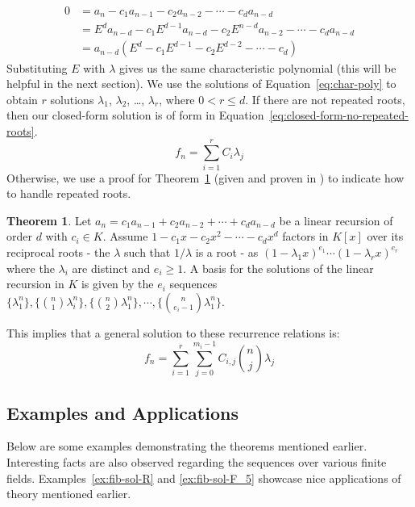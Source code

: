 \documentclass[a4paper]{article}
\theoremstyle{definition}
\newtheorem{theorem}{Theorem}[section]
\begin{document}
\begin{align*}
0
&= a_n-c_1a_{n-1}-c_2a_{n-2}-\cdots-c_{d}a_{n-d} \\
&= E^{d}a_{n-d}-c_1E^{d-1}a_{n-d}-c_2E^{n-d}a_{n-2}-\cdots-c_{d}a_{n-d} \\
&= a_{n-d}(E^d-c_1E^{d-1}-c_2E^{d-2}-\cdots-c_d)
\end{align*}
Substituting $E$ with $\lambda$ gives us the same characteristic polynomial (this will be helpful in the next
section). We use the solutions of Equation~\ref{eq:char-poly} to obtain $r$ solutions $\lambda_1$,
$\lambda_2$, \ldots, $\lambda_r$, where $0<r\le d$. If there are not repeated roots, then our closed-form
solution is of form in Equation~\ref{eq:closed-form-no-repeated-roots}.
\begin{equation}
f_n=\sum_{i=1}^r C_{i}\lambda_j
\label{eq:closed-form-no-repeated-roots}
\end{equation}
Otherwise, we use a proof for Theorem~\ref{thm:repeated-roots} (given and proven in
\cite{bib:solve-lin-rec-field}) to indicate how to handle repeated roots. 
\\
\begin{theorem}
Let $a_n = c_1a_{n-1} + c_2a_{n-2} + \cdots + c_{d}a_{n-d}$ be a linear recursion of order $d$ with
$c_i \in K$. Assume $1 - c_1x - c_2x^2 - \cdots - c_{d}x^d$ factors in $K[x]$ over its reciprocal roots - the
$\lambda$ such that $1/\lambda$ is a root - as $(1-\lambda_{1}x)^{e_1} \cdots (1-\lambda_{r}x)^{e_r}$ where
the $\lambda_i$ are distinct and $e_i \ge 1$. A basis for the solutions of the linear recursion in $K$ is
given by the $e_i$ sequences
$\{\lambda_1^n\}, \{\binom{n}{1}\lambda_i^n\}, \{\binom{n}{2}\lambda_1^n\}, \cdots, \{\binom{n}{e_i-1}\lambda_1^n\}$.
\label{thm:repeated-roots}
\end{theorem}
This implies that a general solution to these recurrence relations is:
\begin{equation}
f_n=\sum_{i=1}^r\sum_{j=0}^{m_i-1} C_{i,j}\binom{n}{j}\lambda_j
\label{eq:closed-form-repeated-roots}
\end{equation}

\subsection{Examples and Applications}

Below are some examples demonstrating the theorems mentioned earlier. Interesting facts are also
observed regarding the sequences over various finite fields. Examples~\ref{ex:fib-sol-R} and
\ref{ex:fib-sol-F_5} showcase nice applications of theory mentioned earlier.
\\
\end{document}
